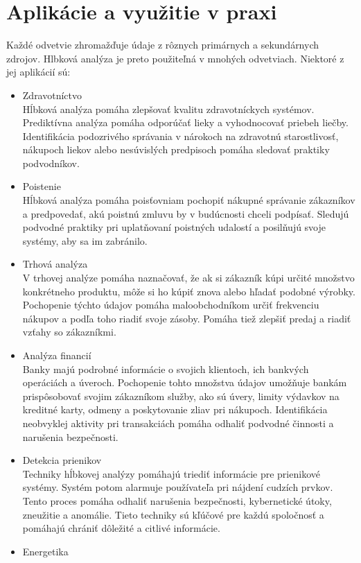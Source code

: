 \documentclass[10pt,twoside,slovak,a4paper]{article}
\begin{document}
\section{Aplikácie a využitie v praxi}
Každé odvetvie zhromažďuje údaje z rôznych primárnych a sekundárnych zdrojov. Hlbková analýza je preto použiteľná v mnohých odvetviach. Niektoré z jej aplikácií sú:
\begin{itemize}
\item Zdravotníctvo\\
Hĺbková analýza pomáha zlepšovať kvalitu zdravotníckych systémov. Prediktívna analýza pomáha odporúčať lieky a vyhodnocovať priebeh liečby. Identifikácia podozrivého správania v nárokoch na zdravotnú starostlivosť, nákupoch liekov alebo nesúvislých predpisoch pomáha sledovať praktiky podvodníkov.
\item Poistenie\\
Hĺbková analýza pomáha poisťovniam pochopiť nákupné správanie zákazníkov a predpovedať, akú poistnú zmluvu by v budúcnosti chceli podpísať. Sledujú podvodné praktiky pri uplatňovaní poistných udalostí a posilňujú svoje systémy, aby sa im zabránilo. 
\item Trhová analýza\\
V trhovej analýze pomáha naznačovať, že ak si zákazník kúpi určité množstvo konkrétneho produktu, môže si ho kúpiť znova alebo hľadať podobné výrobky. Pochopenie týchto údajov pomáha maloobchodníkom určiť frekvenciu nákupov a podľa toho riadiť svoje zásoby. Pomáha tiež zlepšiť predaj a riadiť vzťahy so zákazníkmi.
\item Analýza financií\\
Banky majú podrobné informácie o svojich klientoch, ich bankvých operáciách a úveroch. Pochopenie tohto množstva údajov umožňuje bankám prispôsobovať svojim zákazníkom služby, ako sú úvery, limity výdavkov na kreditné karty, odmeny a poskytovanie zliav pri nákupoch. Identifikácia neobvyklej aktivity pri transakciách pomáha odhaliť podvodné činnosti a narušenia bezpečnosti.
\item Detekcia prienikov\\
Techniky hĺbkovej analýzy pomáhajú triediť informácie pre prienikové systémy. Systém potom alarmuje používateľa pri nájdení cudzích prvkov. Tento proces pomáha odhaliť narušenia bezpečnosti, kybernetické útoky, zneužitie a anomálie. Tieto techniky sú kľúčové pre každú spoločnosť a pomáhajú chrániť dôležité a citlivé informácie.
\item Energetika\\

\end{itemize}
\end{document}
